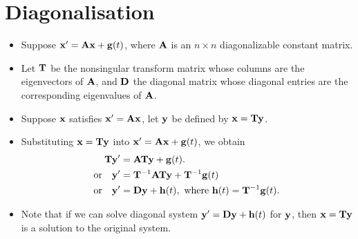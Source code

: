 \documentclass[11pt,a4paper]{article}
\begin{document}
	\section*{Diagonalisation}
	\begin{itemize}
		\item Suppose $\vb{x}^\prime = \vb{A}\vb{x} + \vb{g}(t)$, where $\vb{A}$ is an $n \times n$ diagonalizable constant matrix.
		\item Let $\vb{T}$ be the nonsingular transform matrix whose columns are the eigenvectors of $\vb{A}$, and $\vb{D}$ the diagonal matrix whose diagonal entries are the corresponding eigenvalues of $\vb{A}$.
		\item Suppose $\vb{x}$ satisfies $\vb{x}^\prime = \vb{A}\vb{x}$, let $\vb{y}$ be defined by $\vb{x} = \vb{Ty}$.
		\item Substituting $\vb{x} = \vb{Ty}$ into $\vb{x}^\prime = \vb{Ax} + \vb{g}(t)$, we obtain
		\begin{align*}
			\vb{T}\vb{y}^\prime &= \vb{ATy} + \vb{g}(t).\\
			\text{or}\quad \vb{y}^\prime &= \vb{T}^{-1}\vb{ATy} + \vb{T}^{-1}\vb{g}(t)\\
			\text{or} \quad \vb{y}^\prime &= \vb{Dy} + \vb{h}(t),\ \text{where}\ \vb{h}(t) = \vb{T}^{-1}\vb{g}(t).
		\end{align*}
		\item Note that if we can solve diagonal system $\vb{y}^\prime = \vb{Dy} + \vb{h}(t)$ for $\vb{y}$, then $\vb{x} = \vb{Ty}$ is a solution to the original system.
	\end{itemize}
\end{document}
